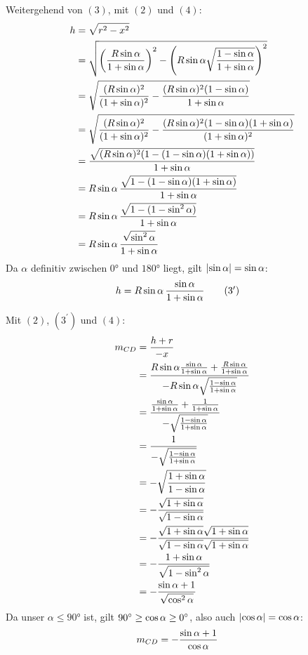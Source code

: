 \begin{samepage}
	Weitergehend von $(3)$, mit $(2)$ und $(4)$: \nopagebreak
	\begin{align*}
		h &= \sqrt{r^2-x^2} \\
		&= \sqrt{\left(\frac{R\sin\alpha}{1+\sin\alpha}\right)^2 - \left(R\sin\alpha\sqrt{\frac{1-\sin\alpha}{1+\sin\alpha}}\right)^2} \\
		&= \sqrt{\frac{(R\sin\alpha)^2}{(1+\sin\alpha)^2} - \frac{(R\sin\alpha)^2(1-\sin\alpha)}{1+\sin\alpha}} \\
		&= \sqrt{\frac{(R\sin\alpha)^2}{(1+\sin\alpha)^2} - \frac{(R\sin\alpha)^2(1-\sin\alpha)(1+\sin\alpha)}{(1+\sin\alpha)^2}} \\
		&= \frac{\sqrt{(R\sin\alpha)^2(1-(1-\sin\alpha)(1+\sin\alpha))}}{1+\sin\alpha} \\
		&= R\sin\alpha \, \frac{\sqrt{1-(1-\sin\alpha)(1+\sin\alpha)}}{1+\sin\alpha} \\
		&= R\sin\alpha \, \frac{\sqrt{1-(1-\sin^2\alpha)}}{1+\sin\alpha} \\
		&= R\sin\alpha \, \frac{\sqrt{\sin^2\alpha}}{1+\sin\alpha}
	\end{align*}
	Da $\alpha$ definitiv zwischen $\ang{0}$ und $\ang{180}$ liegt, gilt $\left|\sin\alpha\right| = \sin\alpha$:
	\begin{align*}
		h &= R\sin\alpha \, \frac{\sin\alpha}{1+\sin\alpha} \tag{$3^\prime$}
	\end{align*}
\end{samepage}
Mit $(2)$, $(3^\prime)$ und $(4)$: \nopagebreak
\begin{align*}
	m_{CD} &= \frac{h+r}{-x} \\
	&= \frac{R\sin\alpha \frac{\sin\alpha}{1+\sin\alpha} + \frac{R\sin\alpha}{1+\sin\alpha}}{-R\sin\alpha\sqrt{\frac{1-\sin\alpha}{1+\sin\alpha}}} \\
	&= \frac{\frac{\sin\alpha}{1+\sin\alpha}+\frac{1}{1+\sin\alpha}}{-\sqrt{\frac{1-\sin\alpha}{1+\sin\alpha}}} \\
	&= \frac{1}{-\sqrt{\frac{1-\sin\alpha}{1+\sin\alpha}}} \\
	&= -\sqrt{\frac{1+\sin\alpha}{1-\sin\alpha}} \\
	&= -\frac{\sqrt{1+\sin\alpha}}{\sqrt{1-\sin\alpha}} \\
	&= -\frac{\sqrt{1+\sin\alpha}\sqrt{1+\sin\alpha}}{\sqrt{1-\sin\alpha}\sqrt{1+\sin\alpha}} \\
	&= -\frac{1+\sin\alpha}{\sqrt{1 - \sin^2\alpha}} \\
	&= -\frac{\sin\alpha+1}{\sqrt{\cos^2\alpha}}
\end{align*}
Da unser $\alpha \leq \ang{90}$ ist, gilt $\ang{90} \geq \cos\alpha \geq \ang{0}$, also auch $\left|\cos\alpha\right| = \cos\alpha$:
\begin{align*}
	m_{CD} &= -\frac{\sin\alpha+1}{\cos\alpha}
\end{align*}
